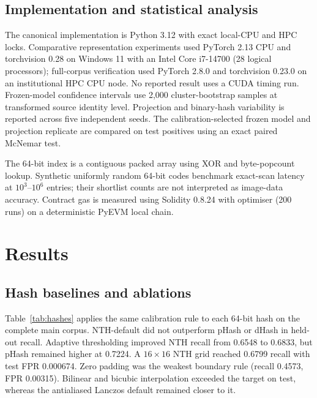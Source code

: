 \documentclass[12pt]{article}
\begin{document}
\subsection{Implementation and statistical analysis}

The canonical implementation is Python 3.12 with exact local-CPU and HPC locks. Comparative representation experiments used PyTorch 2.13 CPU and torchvision 0.28 on Windows 11 with an Intel Core i7-14700 (28 logical processors); full-corpus verification used PyTorch 2.8.0 and torchvision 0.23.0 on an institutional HPC CPU node. No reported result uses a CUDA timing run. Frozen-model confidence intervals use 2,000 cluster-bootstrap samples at transformed source identity level. Projection and binary-hash variability is reported across five independent seeds. The calibration-selected frozen model and projection replicate are compared on test positives using an exact paired McNemar test.

The 64-bit index is a contiguous packed array using XOR and byte-popcount lookup. Synthetic uniformly random 64-bit codes benchmark exact-scan latency at $10^3$--$10^6$ entries; their shortlist counts are not interpreted as image-data accuracy. Contract gas is measured using Solidity 0.8.24 with optimiser (200 runs) on a deterministic PyEVM local chain.

\color{black}
\section{Results}
\color{revisionred}

\subsection{Hash baselines and ablations}

Table~\ref{tab:hashes} applies the same calibration rule to each 64-bit hash on the complete main corpus. NTH-default did not outperform pHash or dHash in held-out recall. Adaptive thresholding improved NTH recall from 0.6548 to 0.6833, but pHash remained higher at 0.7224. A $16\times16$ NTH grid reached 0.6799 recall with test FPR 0.000674. Zero padding was the weakest boundary rule (recall 0.4573, FPR 0.00315). Bilinear and bicubic interpolation exceeded the target on test, whereas the antialiased Lanczos default remained closer to it.
\end{document}
